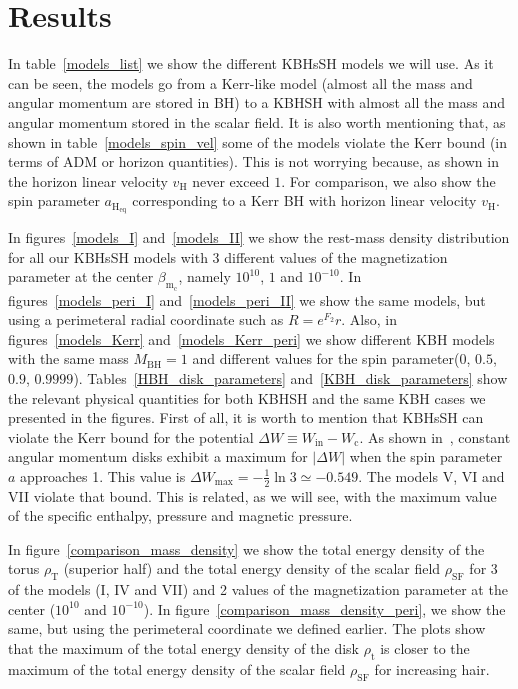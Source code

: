 \documentclass[twocolumn,aps,showpacs,showkeys,prd,superscriptaddress,byrevtex, amsmath]{revtex4-1}
\begin{document}
\section{Results}
In table~\ref{models_list} we show the different KBHsSH models we will use. As it can be seen, the models go from a Kerr-like model (almost all the mass and angular momentum are stored in BH) to a KBHSH with almost all the mass and angular momentum stored in the scalar field. It is also worth mentioning that, as shown in table~\ref{models_spin_vel} some of the models violate the Kerr bound (in terms of ADM or horizon quantities). This is not worrying because, as shown in~\cite{Herdeiro:2015c} the horizon linear velocity $v_{\mathrm{H}}$ never exceed $1$. For comparison, we also show the spin parameter $a_{\mathrm{H_{eq}}}$ corresponding to a Kerr BH with horizon linear velocity $v_{\mathrm{H}}$.

In figures~\ref{models_I} and~\ref{models_II} we show the rest-mass density distribution for all our KBHsSH models with 3 different values of the magnetization parameter at the center $\beta_{\mathrm{m_c}}$, namely $10^{10}$, $1$ and $10^{-10}$. In figures~\ref{models_peri_I} and~\ref{models_peri_II} we show the same models, but using a perimeteral radial coordinate such as $R = e^{F_2} r$. Also, in figures~\ref{models_Kerr} and~\ref{models_Kerr_peri} we show different KBH models with the same mass $M_{\mathrm{BH}} = 1$ and different values for the spin parameter($0$, $0.5$, $0.9$, $0.9999$). Tables~\ref{HBH_disk_parameters} and~\ref{KBH_disk_parameters} show the relevant physical quantities for both KBHSH and the same KBH cases we presented in the figures. First of all, it is worth to mention that KBHsSH can violate the Kerr bound for the potential $\Delta W \equiv W_{\mathrm{in}} - W_{\mathrm{c}}$. As shown in~\cite{Abramowicz:1978}, constant angular momentum disks exhibit a maximum for $|\Delta W|$ when the spin parameter $a$ approaches 1. This value is $\Delta W_{\mathrm{max}} = -\frac{1}{2} \ln 3 \simeq -0.549$. The models V, VI and VII violate that bound. This is related, as we will see, with the maximum value of the specific enthalpy, pressure and magnetic pressure.

In figure~\ref{comparison_mass_density} we show the total energy density of the torus $\rho_{\mathrm{T}}$ (superior half) and the total energy density of the scalar field $\rho_{\mathrm{SF}}$ for 3 of the models (I, IV and VII) and 2 values of the magnetization parameter at the center ($10^{10}$ and $10^{-10}$). In figure~\ref{comparison_mass_density_peri}, we show the same, but using the perimeteral coordinate we defined earlier. The plots show that the maximum of the total energy density of the disk $\rho_{\mathrm{t}}$ is closer to the maximum of the total energy density of the scalar field $\rho_{\mathrm{SF}}$ for increasing hair.
\end{document}
